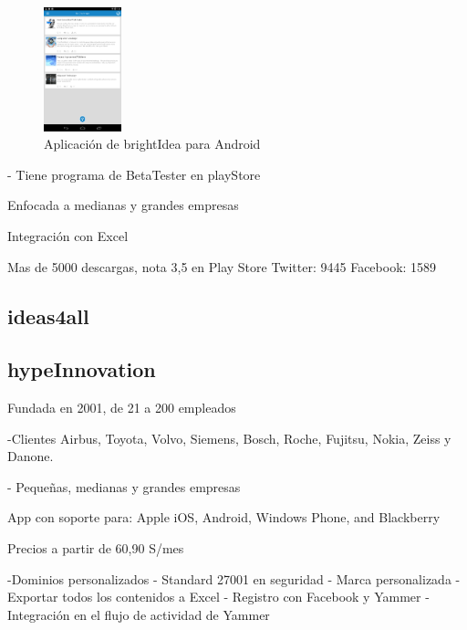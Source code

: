 \begin{figure}[!h]
\begin{center}
		\includegraphics[width=0.2\textwidth]{./img/competencia/brightIdea/6.png}
		\caption{Aplicación de brightIdea para Android}
		\label{fig:brightIdea}
	\end{center}
\end{figure}

- Tiene programa de BetaTester en playStore

Enfocada a medianas y grandes empresas

Integración con Excel


Mas de 5000 descargas, nota 3,5 en Play Store
Twitter: 9445
Facebook: 1589
\subsection{ideas4all}


\subsection{hypeInnovation}

Fundada en 2001, de 21 a 200 empleados

-Clientes
Airbus, Toyota, Volvo, Siemens, Bosch, Roche, 
Fujitsu, Nokia, Zeiss y Danone.

- Pequeñas, medianas y grandes empresas

App con soporte para: Apple iOS, Android, Windows Phone, and Blackberry

Precios a partir de 60,90 S/mes

-Dominios personalizados
- Standard 27001 en seguridad
- Marca personalizada
- Exportar todos los contenidos a Excel
- Registro con Facebook y Yammer
- Integración en el flujo de actividad de Yammer

